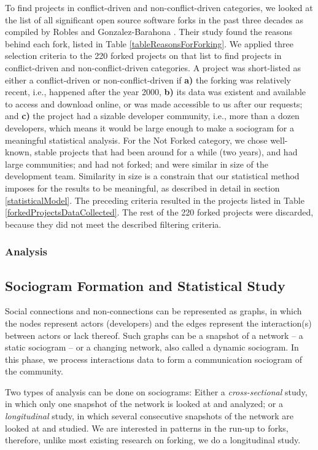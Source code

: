 \documentclass[12pt,letterpaper]{gthesis2}  %
\begin{document}
To find projects in conflict-driven and non-conflict-driven categories, we looked at the list of all significant open source software forks in the past three decades as compiled by Robles and Gonzalez-Barahona \cite{Robles}. Their study found the reasons behind each fork, listed in Table \ref{tableReasonsForForking}. We applied three selection criteria to the 220 forked projects on that list to find projects in conflict-driven and non-conflict-driven categories. A project was short-listed as either a conflict-driven or non-conflict-driven if \textbf{a)} the forking was relatively recent, i.e., happened after the year 2000, \textbf{b)} its data was existent and available to access and download online, or was made accessible to us after our requests; and \textbf{c)} the project had a sizable developer community, i.e., more than a dozen developers, which means it would be large enough to make a sociogram for a meaningful statistical analysis. For the Not Forked category, we chose well-known, stable projects that had been around for a while (two years), and had large communities; and had not forked; and were similar in size of the development team. Similarity in size is a constrain that our statistical method imposes for the results to be meaningful, as described in detail in section \ref{statisticalModel}.  The preceding criteria resulted in the projects listed in Table \ref{forkedProjectsDataCollected}. The rest of the 220 forked projects were discarded, because they did not meet the described filtering criteria.


\subsubsection{Analysis}
\subsection*{Sociogram Formation and Statistical Study}

Social connections and non-connections can be represented as graphs, in which the nodes represent actors (developers) and the edges represent the interaction(s) between actors or lack thereof. Such graphs can be a snapshot of a network -- a static sociogram -- or a changing network, also called a dynamic sociogram. In this phase, we process interactions data to form a communication sociogram of the community.

Two types of analysis can be done on sociograms: Either a \textit{cross-sectional} study, in which only one snapshot of the network is looked at and analyzed; or a \textit{longitudinal} study, in which several consecutive snapshots of the network are looked at and studied.  We are interested in patterns in the run-up to forks, therefore, unlike most existing research on forking, we do a longitudinal study.
\end{document}
